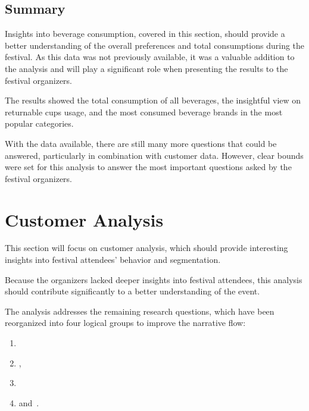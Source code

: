 
\subsection{Summary}
\label{subsec:analysis-beverage-consumption-summary}

Insights into beverage consumption, covered in this section, should provide a better understanding of the overall preferences and total consumptions during the festival.
As this data was not previously available, it was a valuable addition to the analysis and will play a significant role when presenting the results to the festival organizers.

The results showed the total consumption of all beverages, the insightful view on returnable cups usage, and the most consumed beverage brands in the most popular categories.

With the data available, there are still many more questions that could be answered, particularly in combination with customer data.
However, clear bounds were set for this analysis to answer the most important questions asked by the festival organizers.


\pagebreak[4]


\section{Customer Analysis}
\label{sec:analysis-customers}

This section will focus on customer analysis, which should provide interesting insights into festival attendees' behavior and segmentation.

Because the organizers lacked deeper insights into festival attendees, this analysis should contribute significantly to a better understanding of the event.

The analysis addresses the remaining research questions, which have been reorganized into four logical groups to improve the narrative flow:\\
\begin{enumerate}
	\item {}
	\item {},
	\item {}
	\item and~.
\end{enumerate}

